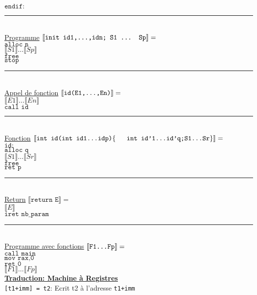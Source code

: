 \documentclass[12pt,twocolumn]{report}
\begin{document}
    $\texttt{endif:}$\\
\rule{9cm}{0.1pt}\\
    \underline{Programme}
    $\llbracket \texttt{init id1,\dots,idn; S1 ... Sp} \rrbracket = $\\
    $\texttt{alloc n}$\\
    $\llbracket S1 \rrbracket \dots \llbracket Sp \rrbracket$\\
    $\texttt{free}$\\
    $\texttt{stop}$\\
\rule{9cm}{0.1pt}\\
    \underline{Appel de fonction}
    $\llbracket \texttt{id(E1,\dots,En)} \rrbracket = $\\
    $\llbracket E1 \rrbracket \dots \llbracket En \rrbracket$\\
    $\texttt{call id}$\\
\rule{9cm}{0.1pt}\\
    \underline{Fonction}
    \small $\llbracket \texttt{int id(int id1\dots idp)}\lbrace\\
    \hphantom{aaa} \texttt{int id'1\dots id'q;S1\dots Sr} \rbrace \rrbracket =$\normalsize\\
    $\texttt{id:}$\\
    \hphantom{aaaaaa}$\texttt{alloc q}$\\
    \hphantom{aaaaaa}$\llbracket S1 \rrbracket \dots \llbracket Sr \rrbracket$\\
    \hphantom{aaaaaa}$\texttt{free}$\\
    \hphantom{aaaaaa}$\texttt{ret p}$\\
\rule{9cm}{0.1pt}\\
    \underline{Return}
    $\llbracket \texttt{return E} \rrbracket =$\\
    $\llbracket E \rrbracket$\\
    $\texttt{iret nb\_param}$\\
\rule{9cm}{0.1pt}\\
    \underline{Programme avec fonctions}
    $\llbracket \texttt{F1\dots Fp} \rrbracket = $\\
    $\texttt{call main}$\\
    $\texttt{mov rax,0}$\\
    $\texttt{ret 0}$\\
    $\llbracket F1 \rrbracket \dots \llbracket Fp \rrbracket$\\
\Large\underline{\textbf{Traduction: Machine à Registres}}\normalsize\\
\texttt{[t1+imm] = t2}: Ecrit t2 à l'adresse \texttt{t1+imm}\\
\end{document}
